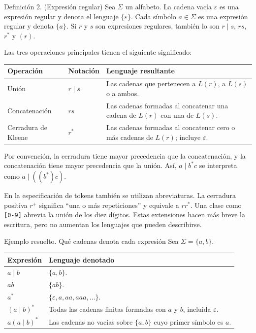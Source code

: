 \documentclass[11pt,spanish]{article}
\providecommand{\tabularnewline}{\\}
\begin{document}
\begin{definicion}{Definición 2. (Expresión regular)}
Sea \(\Sigma\) un alfabeto. La cadena vacía \(\varepsilon\) es una expresión regular y denota el lenguaje \(\{\varepsilon\}\). Cada símbolo \(a\in\Sigma\) es una expresión regular y denota \(\{a\}\). Si \(r\) y \(s\) son expresiones regulares, también lo son \(r\mid s\), \(rs\), \(r^{*}\) y \((r)\).
\end{definicion}

Las tres operaciones principales tienen el siguiente significado:

\begin{center}
\renewcommand{\arraystretch}{1.3}
\begin{tabular}{|p{}|p{}|p{}|}
\hline
\textbf{Operación} & \textbf{Notación} & \textbf{Lenguaje resultante} \tabularnewline
\hline
Unión & \(r\mid s\) & Las cadenas que pertenecen a \(L(r)\), a \(L(s)\) o a ambos. \tabularnewline
\hline
Concatenación & \(rs\) & Las cadenas formadas al concatenar una cadena de \(L(r)\) con una de \(L(s)\). \tabularnewline
\hline
Cerradura de Kleene & \(r^{*}\) & Las cadenas formadas al concatenar cero o más cadenas de \(L(r)\); incluye \(\varepsilon\). \tabularnewline
\hline
\end{tabular}
\end{center}

Por convención, la cerradura tiene mayor precedencia que la concatenación, y la concatenación tiene mayor precedencia que la unión. Así, \(a\mid b^{*}c\) se interpreta como \(a\mid((b^{*})c)\).

En la especificación de tokens también se utilizan abreviaturas. La cerradura positiva \(r^{+}\) significa ``una o más repeticiones'' y equivale a \(rr^{*}\). Una clase como \texttt{[0-9]} abrevia la unión de los diez dígitos. Estas extensiones hacen más breve la escritura, pero no aumentan los lenguajes que pueden describirse.

\begin{ejemplo}{Ejemplo resuelto. Qué cadenas denota cada expresión}
Sea \(\Sigma=\{a,b\}\).

\begin{center}
\renewcommand{\arraystretch}{1.25}
\begin{tabular}{|p{}|p{}|}
\hline
\textbf{Expresión} & \textbf{Lenguaje denotado} \tabularnewline
\hline
\(a\mid b\) & \(\{a,b\}\). \tabularnewline
\hline
\(ab\) & \(\{ab\}\). \tabularnewline
\hline
\(a^{*}\) & \(\{\varepsilon,a,aa,aaa,\ldots\}\). \tabularnewline
\hline
\((a\mid b)^{*}\) & Todas las cadenas finitas formadas con \(a\) y \(b\), incluida \(\varepsilon\). \tabularnewline
\hline
\(a(a\mid b)^{*}\) & Las cadenas no vacías sobre \(\{a,b\}\) cuyo primer símbolo es \(a\). \tabularnewline
\hline
\end{tabular}
\end{center}
\end{ejemplo}
\end{document}
